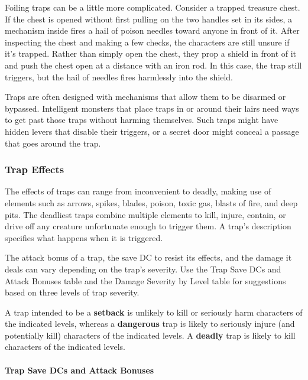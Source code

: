 \documentclass[
]{article}
\begin{document}
Foiling traps can be a little more complicated. Consider a trapped
treasure chest. If the chest is opened without first pulling on the two
handles set in its sides, a mechanism inside fires a hail of poison
needles toward anyone in front of it. After inspecting the chest and
making a few checks, the characters are still unsure if it's trapped.
Rather than simply open the chest, they prop a shield in front of it and
push the chest open at a distance with an iron rod. In this case, the
trap still triggers, but the hail of needles fires harmlessly into the
shield.

Traps are often designed with mechanisms that allow them to be disarmed
or bypassed. Intelligent monsters that place traps in or around their
lairs need ways to get past those traps without harming themselves. Such
traps might have hidden levers that disable their triggers, or a secret
door might conceal a passage that goes around the trap.

\hypertarget{trap-effects}{%
\subsubsection{Trap Effects}\label{trap-effects}}

The effects of traps can range from inconvenient to deadly, making use
of elements such as arrows, spikes, blades, poison, toxic gas, blasts of
fire, and deep pits. The deadliest traps combine multiple elements to
kill, injure, contain, or drive off any creature unfortunate enough to
trigger them. A trap's description specifies what happens when it is
triggered.

The attack bonus of a trap, the save DC to resist its effects, and the
damage it deals can vary depending on the trap's severity. Use the Trap
Save DCs and Attack Bonuses table and the Damage Severity by Level table
for suggestions based on three levels of trap severity.

A trap intended to be a \textbf{setback} is unlikely to kill or
seriously harm characters of the indicated levels, whereas a
\textbf{dangerous} trap is likely to seriously injure (and potentially
kill) characters of the indicated levels. A \textbf{deadly} trap is
likely to kill characters of the indicated levels.

\hypertarget{trap-save-dcs-and-attack-bonuses}{%
\paragraph{Trap Save DCs and Attack
Bonuses}\label{trap-save-dcs-and-attack-bonuses}}
\end{document}

